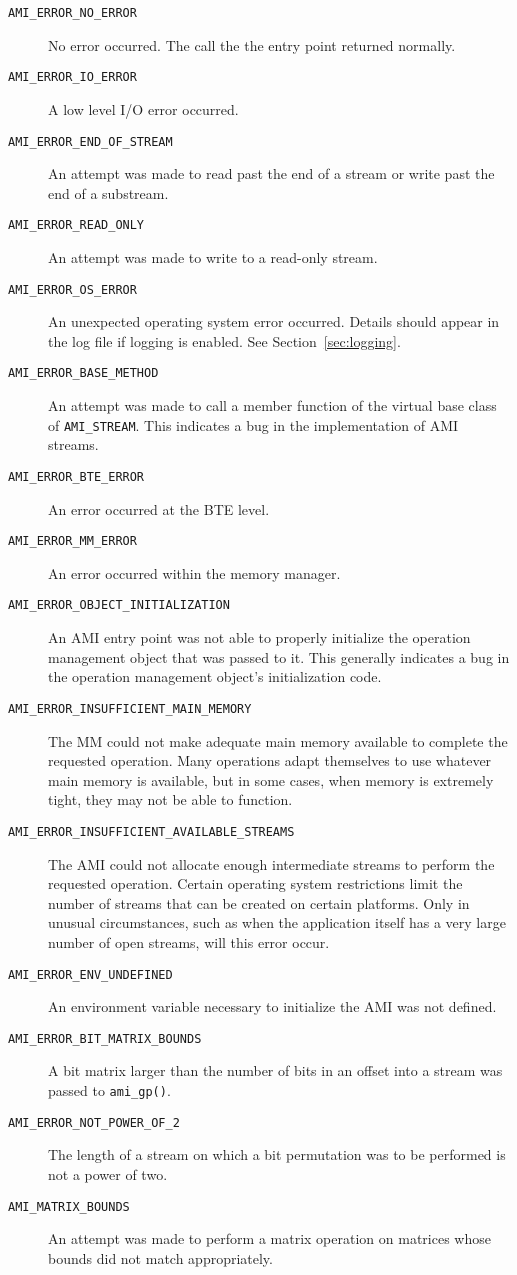 \begin{description}
\item[{\tt AMI\_ERROR\_NO\_ERROR}] No error occurred.  The call the the
  entry point returned normally.
\item[{\tt AMI\_ERROR\_IO\_ERROR}] A low level I/O error occurred.
\item[{\tt AMI\_ERROR\_END\_OF\_STREAM}] An attempt was made to read
  past the end of a stream or write past the end of a substream.
\item[{\tt AMI\_ERROR\_READ\_ONLY}] An attempt was made to write to a
  read-only stream.
\item[{\tt AMI\_ERROR\_OS\_ERROR}]  An unexpected operating system
  error occurred.  Details should appear in the log file if logging is
  enabled.  See Section~\ref{sec:logging}.
\item[{\tt AMI\_ERROR\_BASE\_METHOD}] An attempt was made to call a
  member function of the virtual base class of {\tt AMI\_STREAM}.  This
  indicates a bug in the implementation of AMI streams.
\item[{\tt AMI\_ERROR\_BTE\_ERROR}] An error occurred at the BTE
  level.  
\item[{\tt AMI\_ERROR\_MM\_ERROR}] An error occurred within the memory
  manager.
\item[{\tt AMI\_ERROR\_OBJECT\_INITIALIZATION}] An AMI entry point was
  not able to properly initialize the operation management object that
  was passed to it.  This generally indicates a bug in the operation
  management object's initialization code.
\item[{\tt AMI\_ERROR\_INSUFFICIENT\_MAIN\_MEMORY}] The MM could not
  make adequate main memory available to complete the requested
  operation.  Many operations adapt themselves to use whatever main
  memory is available, but in some cases, when memory is extremely
  tight, they may not be able to function.
\item[{\tt AMI\_ERROR\_INSUFFICIENT\_AVAILABLE\_STREAMS}]
  The AMI could not allocate enough intermediate streams to perform
  the requested operation.  Certain operating system restrictions
  limit the number of streams that can be created on certain
  platforms.  Only in unusual circumstances, such as when the
  application itself has a very large number of open streams, will
  this error occur. 
\item[{\tt AMI\_ERROR\_ENV\_UNDEFINED}]
  An environment variable necessary to initialize the AMI was not defined.
\item[{\tt AMI\_ERROR\_BIT\_MATRIX\_BOUNDS}]
  A bit matrix larger than the number of bits in an offset into a
  stream was passed to \verb|ami_gp()|.
\item[{\tt AMI\_ERROR\_NOT\_POWER\_OF\_2}]
  The length of a stream on which a bit permutation was to be
  performed is not a power of two.
\item[{\tt AMI\_MATRIX\_BOUNDS}] An attempt was made to perform a
  matrix operation on matrices whose bounds did not match appropriately.
\end{description}



